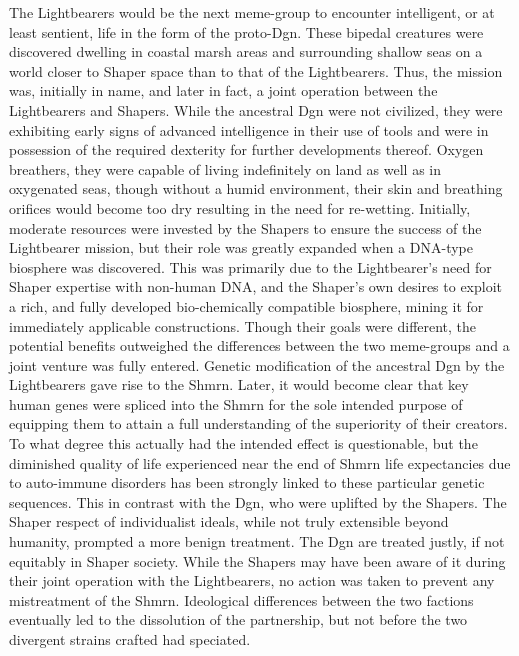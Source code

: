 The Lightbearers would be the next meme-group to encounter
intelligent, or at least sentient, life in the form of the proto-Dgn.
These bipedal creatures were discovered dwelling in coastal marsh
areas and surrounding shallow seas on a world closer to Shaper space
than to that of the Lightbearers. Thus, the mission was, initially in
name, and later in fact, a joint operation between the Lightbearers
and Shapers.  While the ancestral Dgn were not civilized, they were
exhibiting early signs of advanced intelligence in their use of tools
and were in possession of the required dexterity for further
developments thereof.  Oxygen breathers, they were capable of living
indefinitely on land as well as in oxygenated seas, though without a
humid environment, their skin and breathing orifices would become too
dry resulting in the need for re-wetting.  Initially, moderate
resources were invested by the Shapers to ensure the success of the
Lightbearer mission, but their role was greatly expanded when a
DNA-type biosphere was discovered. This was primarily due to the
Lightbearer's need for Shaper expertise with non-human DNA, and the
Shaper's own desires to exploit a rich, and fully developed
bio-chemically compatible biosphere, mining it for immediately
applicable constructions.  Though their goals were different, the
potential benefits outweighed the differences between the two
meme-groups and a joint venture was fully entered.  Genetic
modification of the ancestral Dgn by the Lightbearers gave rise to the
Shmrn.  Later, it would become clear that key human genes were spliced
into the Shmrn for the sole intended purpose of equipping them to
attain a full understanding of the superiority of their creators. To
what degree this actually had the intended effect is questionable, but
the diminished quality of life experienced near the end of Shmrn life
expectancies due to auto-immune disorders has been strongly linked to
these particular genetic sequences. This in contrast with the Dgn, who
were uplifted by the Shapers.  The Shaper respect of individualist
ideals, while not truly extensible beyond humanity, prompted a more
benign treatment.  The Dgn are treated justly, if not equitably in
Shaper society.  While the Shapers may have been aware of it during
their joint operation with the Lightbearers, no action was taken to
prevent any mistreatment of the Shmrn.  Ideological differences
between the two factions eventually led to the dissolution of the
partnership, but not before the two divergent strains crafted had speciated.

